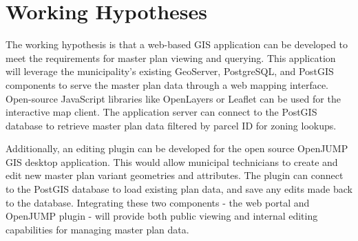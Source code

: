 
\chapter{Working Hypotheses}
\label{ch:working_hypotheses}

The working hypothesis is that a web-based GIS application can be developed to meet the requirements for master plan viewing and querying. This application will leverage the municipality's existing GeoServer, PostgreSQL, and PostGIS components to serve the master plan data through a web mapping interface. Open-source JavaScript libraries like OpenLayers or Leaflet can be used for the interactive map client. The application server can connect to the PostGIS database to retrieve master plan data filtered by parcel ID for zoning lookups.

Additionally, an editing plugin can be developed for the open source OpenJUMP GIS desktop application. This would allow municipal technicians to create and edit new master plan variant geometries and attributes. The plugin can connect to the PostGIS database to load existing plan data, and save any edits made back to the database. Integrating these two components - the web portal and OpenJUMP plugin - will provide both public viewing and internal editing capabilities for managing master plan data.